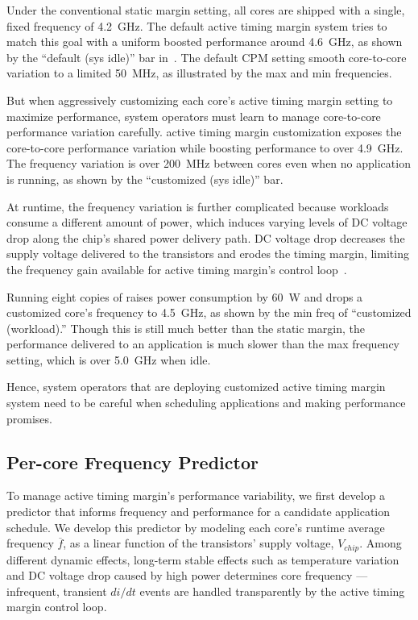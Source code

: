 Under the conventional static margin setting, all cores are shipped with a single, fixed frequency of 4.2~GHz. The default active timing margin system tries to match this goal with a uniform boosted performance around 4.6~GHz, as shown by the ``default (sys idle)'' bar in~. The default CPM setting smooth core-to-core variation to a limited 50~MHz, as illustrated by the max and min frequencies. 

But when aggressively customizing each core's active timing margin setting to maximize performance, system operators must learn to manage core-to-core performance variation carefully. active timing margin customization exposes the core-to-core performance variation while boosting performance to over 4.9~GHz. The frequency variation is over 200~MHz between cores even when no application is running, as shown by the ``customized (sys idle)'' bar. 

At runtime, the frequency variation is further complicated because workloads consume a different amount of power, which induces varying levels of DC voltage drop along the chip's shared power delivery path. DC voltage drop decreases the supply voltage delivered to the transistors and erodes the timing margin, limiting the frequency gain available for active timing margin's control loop~\cite{zu2015adaptive}. 

Running eight copies of  raises power consumption by 60~W and drops a customized core's frequency to 4.5~GHz, as shown by the min freq of ``customized (workload).'' Though this is still much better than the static margin, the performance delivered to an application is much slower than the max frequency setting, which is over 5.0~GHz when idle. 

Hence, system operators that are deploying customized active timing margin system need to be careful when scheduling applications and making performance promises.


\subsection{Per-core Frequency Predictor}
\label{sec:process:schedule:predict}

To manage active timing margin's performance variability, we first develop a predictor that informs frequency and performance for a candidate application schedule. We develop this predictor by modeling each core's runtime average frequency $\overline{f}$, as a linear function of the transistors' supply voltage, $V_{chip}$. Among different dynamic effects, long-term stable effects such as temperature variation and DC voltage drop caused by high power determines core frequency ---infrequent, transient $di/dt$ events are handled transparently by the active timing margin control loop. 

